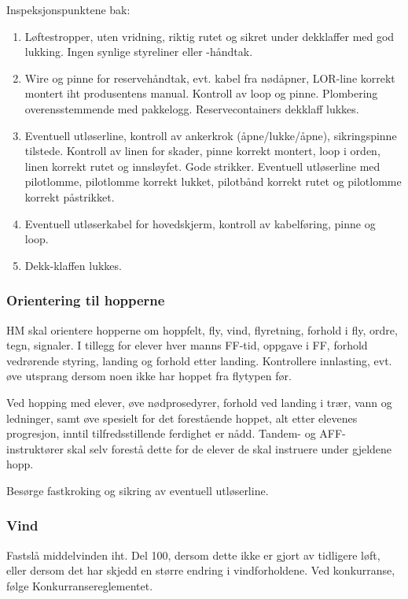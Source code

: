 Inspeksjonspunktene bak:
\begin{enumerate}	
	\item Løftestropper, uten vridning, riktig rutet og sikret under dekklaffer med god lukking. Ingen synlige styreliner eller -håndtak.
	\item Wire og pinne for reservehåndtak, evt. kabel fra nødåpner, LOR-line korrekt montert iht produsentens manual. Kontroll av loop og pinne. Plombering overensstemmende med pakkelogg. Reservecontainers dekklaff lukkes.
	\item Eventuell utløserline, kontroll av ankerkrok (åpne/lukke/åpne), sikringspinne tilstede. Kontroll av linen for skader, pinne korrekt montert, loop i orden, linen korrekt rutet og innsløyfet. Gode strikker. Eventuell utløserline med pilotlomme, pilotlomme korrekt lukket, pilotbånd korrekt rutet og pilotlomme korrekt påstrikket.
	\item Eventuell utløserkabel for hovedskjerm, kontroll av kabelføring, pinne og loop.
	\item Dekk-klaffen lukkes.
\end{enumerate}

\subsubsection{Orientering til hopperne}
HM skal orientere hopperne om hoppfelt, fly, vind, flyretning, forhold i fly, ordre, tegn, signaler. I tillegg for elever hver manns FF-tid, oppgave i FF, forhold vedrørende styring, landing og forhold etter landing. Kontrollere innlasting, evt. øve utsprang dersom noen ikke har hoppet fra flytypen før.

Ved hopping med elever, øve nødprosedyrer, forhold ved landing i trær, vann og ledninger, samt øve spesielt for det forestående hoppet, alt etter elevenes progresjon, inntil tilfredsstillende ferdighet er nådd. Tandem- og AFF- instruktører skal selv forestå dette for de elever de skal instruere under gjeldene hopp.

Besørge fastkroking og sikring av eventuell utløserline.

\subsubsection{Vind}
Fastslå middelvinden iht. Del 100, dersom dette ikke er gjort av tidligere løft, eller dersom det har skjedd en større endring i vindforholdene. Ved konkurranse, følge Konkurransereglementet.

